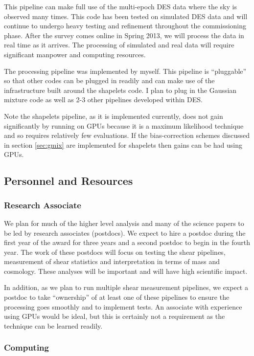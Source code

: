 \documentclass[12pt]{article}
\newcommand{\surveyproper}{Spring 2013}
\begin{document}
This pipeline can make full use of the multi-epoch DES data where the sky is
observed many times.  This code has been tested on simulated DES data and will
continue to undergo heavy testing and refinement throughout the commissioning
phase.  After the survey comes online in \surveyproper, we will process the
data in real time as it arrives.  The processing of simulated and real data
will require significant manpower and computing resources.

The processing pipeline was implemented by myself.  This pipeline is
``pluggable'' so that other codes can be plugged in readily and can make use of
the infrastructure built around the shapelets code.  I plan to plug in
the Gaussian mixture code as well as 2-3 other pipelines developed within
DES.

Note the shapelets pipeline, as it is implemented currently, does not gain
significantly by running on GPUs because it is a maximum likelihood technique
and so requires relatively few evaluations.  If the bias-correction schemes
discussed in section \ref{sec:gmix} are implemented for shapelets then
gains can be had using GPUs.

\subsection{Personnel and Resources} \label{sec:resources}

\subsubsection{Research Associate}

We plan for much of the higher level analysis and many of the science papers to
be led by research associates (postdocs).  We expect to hire a postdoc during
the first year of the award for three years and a second postdoc to begin in
the fourth year.  The work of these postdocs will focus on testing the shear
pipelines, measurement of shear statistics and interpretation in terms of mass
and cosmology.  These analyses will be important and will have high scientific
impact.

In addition, as we plan to run multiple shear measurement pipelines, we expect
a postdoc to take ``ownership'' of at least one of these pipelines to ensure
the processing goes smoothly and to implement tests.  An associate with
experience using GPUs would be ideal, but this is certainly not a requirement
as the technique can be learned readily.

\subsubsection{Computing} \label{sec:computing}
\end{document}
